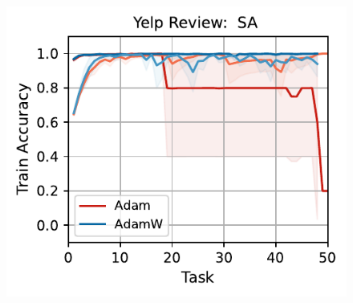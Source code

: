 \begin{figure}[t]
{    \includegraphics[width=\textwidth]{figs/Accuracy/nlp/attention/yelp_review_full_40.pdf}
    }
    \\
\end{figure}
